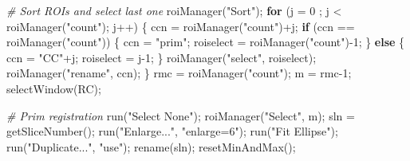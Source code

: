 \documentclass[10pt, b5paper, singlespacinge, twoside]{reedthesis} %
\newenvironment{Shaded}{}{}
\newcommand{\AttributeTok}[1]{#1}
\newcommand{\CommentTok}[1]{\textit{#1}}
\newcommand{\ControlFlowTok}[1]{\textbf{#1}}
\newcommand{\DecValTok}[1]{#1}
\newcommand{\FunctionTok}[1]{#1}
\newcommand{\NormalTok}[1]{#1}
\newcommand{\OtherTok}[1]{#1}
\newcommand{\SpecialCharTok}[1]{#1}
\newcommand{\StringTok}[1]{#1}
\theoremstyle{definition}
\theoremstyle{definition}
\theoremstyle{definition}
\theoremstyle{remark}
\begin{document}
\begin{Shaded}
\begin{Highlighting}[numbers=left,,]
    \CommentTok{\# Sort ROIs and select last one}
        \FunctionTok{roiManager}\NormalTok{(}\StringTok{"Sort"}\NormalTok{);}
        \ControlFlowTok{for}\NormalTok{ (}\AttributeTok{j =} \DecValTok{0}\NormalTok{ ; j }\SpecialCharTok{\textless{}} \FunctionTok{roiManager}\NormalTok{(}\StringTok{"count"}\NormalTok{); j}\SpecialCharTok{++}\NormalTok{) \{}
\NormalTok{            ccn }\OtherTok{=} \FunctionTok{roiManager}\NormalTok{(}\StringTok{"count"}\NormalTok{)}\SpecialCharTok{+}\NormalTok{j;}
            \ControlFlowTok{if}\NormalTok{ (ccn }\SpecialCharTok{==} \FunctionTok{roiManager}\NormalTok{(}\StringTok{"count"}\NormalTok{)) \{}
\NormalTok{                ccn }\OtherTok{=} \StringTok{"prim"}\NormalTok{;}
\NormalTok{                roiselect }\OtherTok{=} \FunctionTok{roiManager}\NormalTok{(}\StringTok{"count"}\NormalTok{)}\SpecialCharTok{{-}}\DecValTok{1}\NormalTok{;}
\NormalTok{            \} }\ControlFlowTok{else}\NormalTok{ \{}
\NormalTok{                ccn }\OtherTok{=} \StringTok{"CC"}\SpecialCharTok{+}\NormalTok{j;}
\NormalTok{                roiselect }\OtherTok{=}\NormalTok{ j}\DecValTok{{-}1}\NormalTok{;}
\NormalTok{            \}}
            \FunctionTok{roiManager}\NormalTok{(}\StringTok{"select"}\NormalTok{, roiselect);}
            \FunctionTok{roiManager}\NormalTok{(}\StringTok{"rename"}\NormalTok{, ccn);}
\NormalTok{        \}}
\NormalTok{        rmc }\OtherTok{=} \FunctionTok{roiManager}\NormalTok{(}\StringTok{"count"}\NormalTok{);}
\NormalTok{        m }\OtherTok{=}\NormalTok{ rmc}\DecValTok{{-}1}\NormalTok{;}
        \FunctionTok{selectWindow}\NormalTok{(RC);}
        
  \CommentTok{\# Prim registration}
        \FunctionTok{run}\NormalTok{(}\StringTok{"Select None"}\NormalTok{);}
        \FunctionTok{roiManager}\NormalTok{(}\StringTok{"Select"}\NormalTok{, m);}
\NormalTok{        sln }\OtherTok{=} \FunctionTok{getSliceNumber}\NormalTok{();}
        \FunctionTok{run}\NormalTok{(}\StringTok{"Enlarge..."}\NormalTok{, }\StringTok{"enlarge=6"}\NormalTok{);}
        \FunctionTok{run}\NormalTok{(}\StringTok{"Fit Ellipse"}\NormalTok{);}
        \FunctionTok{run}\NormalTok{(}\StringTok{"Duplicate..."}\NormalTok{, }\StringTok{"use"}\NormalTok{);}
        \FunctionTok{rename}\NormalTok{(sln);}
        \FunctionTok{resetMinAndMax}\NormalTok{();}
        

\end{Highlighting}
\end{Shaded}
\end{document}
